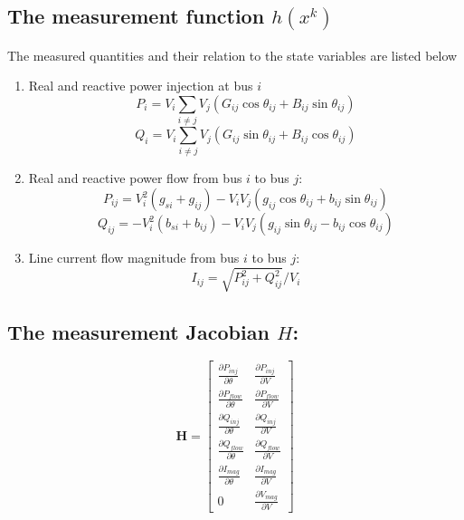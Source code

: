 \documentclass[12pt]{article}
\begin{document}
\subsection*{The measurement function $h(x^k)$}

The measured quantities and their relation to the state variables are listed
below
\begin{enumerate}
\item Real and reactive power injection at bus $i$
\begin{equation}\label{eq:Pi}
P_i = V_i \sum_{i\ne j}V_j(G_{ij}\cos \theta _{ij}+B_{ij}\sin \theta _{ij})
\end{equation} 
\begin{equation}\label{eq:Qi}
Q_i = V_i \sum_{i\ne j}V_j(G_{ij}\sin \theta _{ij}+B_{ij}\cos \theta _{ij})
\end{equation} 
\item Real and reactive power flow from bus $i$ to bus $j$:
\begin{equation}\label{eq:Pij}
P_{ij} = V_i^2(g_{si}+g_{ij}) -V_iV_j(g_{ij}\cos \theta _{ij}+b_{ij}\sin \theta _{ij})
\end{equation}
\begin{equation}\label{eq:Qij}
Q_{ij} = -V_i^2(b_{si}+b_{ij}) -V_iV_j(g_{ij}\sin \theta _{ij}-b_{ij}\cos \theta _{ij})
\end{equation}
\item Line current flow magnitude from bus $i$ to bus $j$:
\begin{equation}\label{eq:Iij}
I_{ij} = \sqrt {P_{ij}^2+Q_{ij}^2}/V_i
\end{equation}
\end{enumerate}




\subsection*{The measurement Jacobian $H$:}

\begin{equation}
\mathbf{H}  =\begin{bmatrix}
\frac{\partial P_{inj}}{\partial \theta} & \frac{\partial P_{inj}}{\partial V}\\ 
\frac{\partial P_{flow}}{\partial \theta} & \frac{\partial P_{flow}}{\partial V}\\ 
\frac{\partial Q_{inj}}{\partial \theta} & \frac{\partial Q_{inj}}{\partial V}\\ 
\frac{\partial Q_{flow}}{\partial \theta} & \frac{\partial Q_{flow}}{\partial V}\\ 
\frac{\partial I_{mag}}{\partial \theta} & \frac{\partial I_{mag}}{\partial V}\\ 
0 & \frac{\partial V_{mag}}{\partial V}
\end{bmatrix}
\end{equation}
\end{document}
